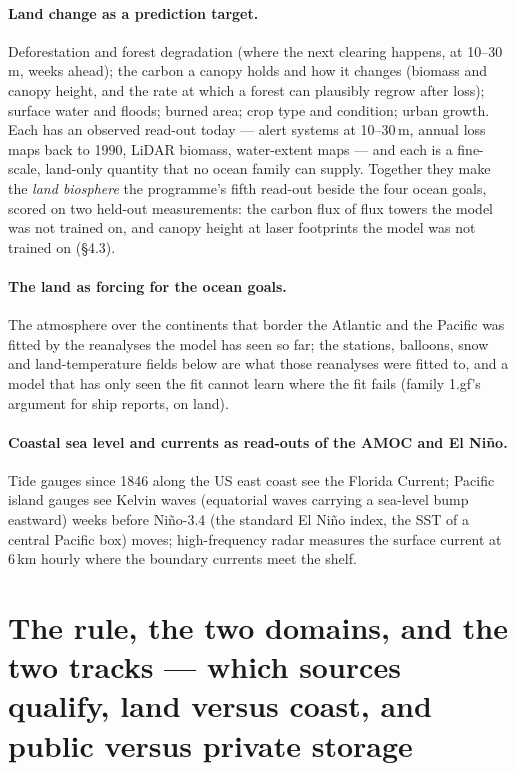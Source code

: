 \documentclass[10pt]{article}
\begin{document}
\paragraph{Land change as a prediction target.} Deforestation and forest
degradation (where the next clearing happens, at 10--30\,m, weeks ahead);
the carbon a canopy holds and how it changes (biomass and canopy height, and
the rate at which a forest can plausibly regrow after loss); surface water and
floods; burned area; crop type and condition; urban growth. Each has an
observed read-out today --- alert systems at 10--30\,m, annual loss maps back
to 1990, LiDAR biomass, water-extent maps --- and each is a fine-scale,
land-only quantity that no ocean family can supply. Together they make the
\emph{land biosphere} the programme's fifth read-out beside the four ocean
goals, scored on two held-out measurements: the carbon flux of flux towers
the model was not trained on, and canopy height at laser footprints the model
was not trained on (\S4.3).

\paragraph{The land as forcing for the ocean goals.} The atmosphere over the
continents that border the Atlantic and the Pacific was fitted by the
reanalyses the model has seen so far; the stations, balloons, snow and
land-temperature fields below are what those reanalyses were fitted to, and a
model that has only seen the fit cannot learn where the fit fails (family
1.gf's argument for ship reports, on land).

\paragraph{Coastal sea level and currents as read-outs of the AMOC and
El Ni\~no.} Tide gauges since 1846 along the US east coast see the Florida
Current; Pacific island gauges see Kelvin waves (equatorial waves carrying a sea-level bump eastward) weeks before Ni\~no-3.4 (the standard El Ni\~no index, the SST of a central Pacific box)
moves; high-frequency radar measures the surface current at 6\,km hourly
where the boundary currents meet the shelf.

\section{The rule, the two domains, and the two tracks --- which sources qualify, land versus coast, and public versus private storage}
\end{document}
